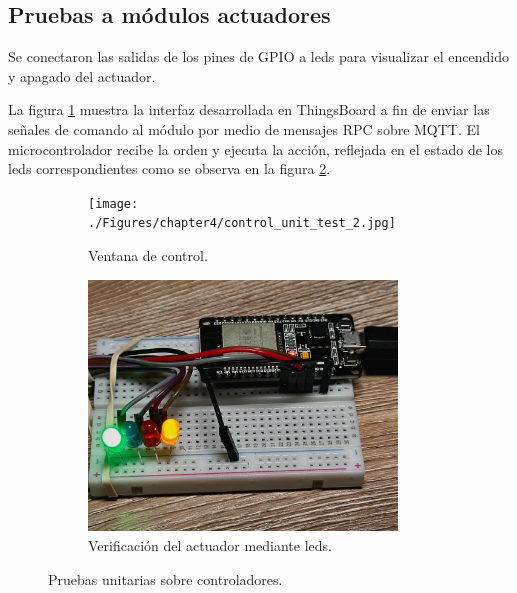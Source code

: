 \subsection{Pruebas a módulos actuadores}
\label{sec:Pruebas a módulos actuadores}

Se conectaron las salidas de los pines de GPIO a leds para visualizar el encendido y apagado del actuador. 

La figura \ref{fig:control_test1} muestra la interfaz desarrollada en ThingsBoard a fin de enviar las señales de comando al módulo por medio de mensajes RPC sobre MQTT. El microcontrolador recibe la orden y ejecuta la acción, reflejada en el estado de los leds correspondientes como se observa en la figura \ref{fig:control_test2}.



\begin{figure}[htpb]
     \centering
       \begin{subfigure}[b]{0.50\textwidth}
	    \centering
		 \texttt{[image: ./Figures/chapter4/control\_unit\_test\_2.jpg]}
		\caption{Ventana de control.}
		\label{fig:control_test1}
     \end{subfigure}
          \hfill
     \begin{subfigure}[b]{0.45\textwidth}
		\centering
		\includegraphics[width=0.90\textwidth]{./Figures/chapter4/control_test2.jpg}
		\caption{Verificación del actuador mediante leds.}
		\label{fig:control_test2}
     \end{subfigure}
     \hfill
        \caption[Pruebas unitarias sobre controladores]{Pruebas unitarias sobre controladores.}
        \label{fig:control_test}
\end{figure}


